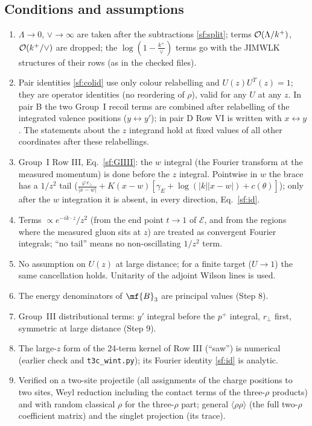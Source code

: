 \subsection{Conditions and assumptions}
\begin{enumerate}
\item[(C1)] $\Lambda\to0$, $\vee\to\infty$ are taken after the subtractions \eqref{sf:split}; terms ${\cal O}(\Lambda/k^{+})$, ${\cal O}(k^{+}/\vee)$ are dropped; the $\log(1-\frac{k^{+}}{\vee})$ terms go with the JIMWLK structures of their rows (as in the checked files).
\item[(C2)] Pair identities \eqref{sf:colid} use only colour relabelling and $U(z)U^{T}(z)=1$; they are operator identities (no reordering of $\rho$), valid for any $U$ at any $z$. In pair B the two Group~I recoil terms are combined after relabelling of the integrated valence positions ($y\leftrightarrow y'$); in pair D Row VI is written with $x\leftrightarrow y$. The statements about the $z$ integrand hold at fixed values of all other coordinates after these relabellings.
\item[(C3)] Group~I Row III, Eq.~\eqref{sf:GIIII}: the $w$ integral (the Fourier transform at the measured momentum) is done before the $z$ integral. Pointwise in $w$ the brace has a $1/z^{2}$ tail ($\frac{\varphi\,e_{\perp}}{|x-w|}+K(x-w)[\gamma_{E}+\log(|k||x-w|)+c(\theta)]$); only after the $w$ integration it is absent, in every direction, Eq.~\eqref{sf:id}.
\item[(C4)] Terms $\propto e^{-ik\cdot z}/z^{2}$ (from the end point $t\to1$ of $\mathcal{E}$, and from the regions where the measured gluon sits at $z$) are treated as convergent Fourier integrals; ``no tail'' means no non-oscillating $1/z^{2}$ term.
\item[(C5)] No assumption on $U(z)$ at large distance; for a finite target ($U\to1$) the same cancellation holds. Unitarity of the adjoint Wilson lines is used.
\item[(C6)] The energy denominators of $\mf{B}_{3}$ are principal values (Step 8).
\item[(C7)] Group~III distributional terms: $y'$ integral before the $p^{+}$ integral, $r_{\perp}$ first, symmetric at large distance (Step 9).
\item[(C8)] The large-$z$ form of the 24-term kernel of Row III (``saw'') is numerical (earlier check and \texttt{t3c\_wint.py}); its Fourier identity \eqref{sf:id} is analytic.
\item[(C9)] Verified on a two-site projectile (all assignments of the charge positions to two sites, Weyl reduction including the contact terms of the three-$\rho$ products) and with random classical $\rho$ for the three-$\rho$ part; general $\langle\rho\rho\rangle$ (the full two-$\rho$ coefficient matrix) and the singlet projection (its trace).
\end{enumerate}

